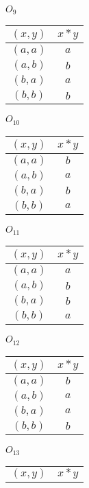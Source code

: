 \documentclass[12pt]{article}
\begin{document}
\begin{flushleft}
\begin{enumerate}
    	\begin{minipage}[h]{.2\textwidth}
				$O_9$
    		\begin{tabular}{ c | c }
      		$(x,y)$ & $x*y$ \\
        	\hline
        	$(a,a)$ & $a$ \\
        	$(a,b)$ & $b$ \\
        	$(b,a)$ & $a$ \\
        	$(b,b)$ & $b$
      	\end{tabular}
    	\end{minipage}
    	\bigskip  	
    	\begin{minipage}[h]{.2\textwidth}
				$O_{10}$
    		\begin{tabular}{ c | c }
      		$(x,y)$ & $x*y$ \\
        	\hline
        	$(a,a)$ & $b$ \\
        	$(a,b)$ & $a$ \\
        	$(b,a)$ & $b$ \\
        	$(b,b)$ & $a$
      	\end{tabular}
    	\end{minipage}   
    	\begin{minipage}[h]{.2\textwidth}
				$O_{11}$
    		\begin{tabular}{ c | c }
      		$(x,y)$ & $x*y$ \\
        	\hline
        	$(a,a)$ & $a$ \\
        	$(a,b)$ & $b$ \\
        	$(b,a)$ & $b$ \\
        	$(b,b)$ & $a$
      	\end{tabular}
    	\end{minipage}   
    	\begin{minipage}[h]{.2\textwidth}
				$O_{12}$
    		\begin{tabular}{ c | c }
      		$(x,y)$ & $x*y$ \\
        	\hline
        	$(a,a)$ & $b$ \\
        	$(a,b)$ & $a$ \\
        	$(b,a)$ & $a$ \\
        	$(b,b)$ & $b$
      	\end{tabular}
    	\end{minipage}
    	\begin{minipage}[h]{.2\textwidth}
				$O_{13}$
    		\begin{tabular}{ c | c }
      		$(x,y)$ & $x*y$ \\

\end{tabular}
\end{minipage}
\end{enumerate}
\end{flushleft}
\end{document}
